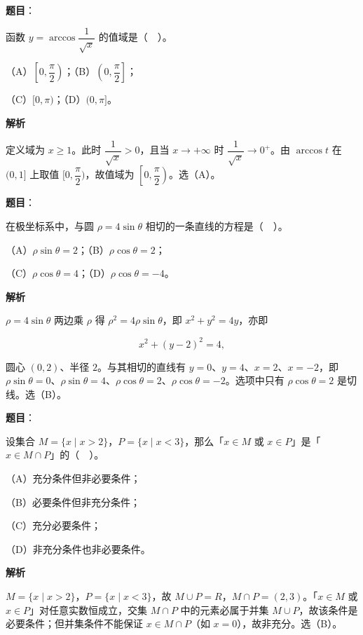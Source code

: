 \begin{answer}

\textbf{题目}：

函数 $y=\arccos\dfrac{1}{\sqrt{x}}$ 的值域是（　）。

（A）$\left[0,\dfrac{\pi}{2}\right)$；（B）$\left(0,\dfrac{\pi}{2}\right]$；

（C）$[0,\pi)$；（D）$(0,\pi]$。

\textbf{解析}

定义域为 $x\ge 1$。此时 $\dfrac{1}{\sqrt{x}}>0$，且当 $x\to+\infty$ 时 $\dfrac{1}{\sqrt{x}}\to 0^{+}$。由 $\arccos t$ 在 $(0,1]$ 上取值 $[0,\dfrac{\pi}{2})$，故值域为 $\left[0,\dfrac{\pi}{2}\right)$。选（A）。


\end{answer}
\begin{answer}

\textbf{题目}：

在极坐标系中，与圆 $\rho=4\sin\theta$ 相切的一条直线的方程是（　）。

（A）$\rho\sin\theta=2$；（B）$\rho\cos\theta=2$；

（C）$\rho\cos\theta=4$；（D）$\rho\cos\theta=-4$。

\textbf{解析}

$\rho=4\sin\theta$ 两边乘 $\rho$ 得 $\rho^{2}=4\rho\sin\theta$，即 $x^{2}+y^{2}=4y$，亦即

\nopagebreak[4]
\[
x^{2}+(y-2)^{2}=4,
\]

圆心 $(0,2)$、半径 $2$。与其相切的直线有 $y=0$、$y=4$、$x=2$、$x=-2$，即 $\rho\sin\theta=0$、$\rho\sin\theta=4$、$\rho\cos\theta=2$、$\rho\cos\theta=-2$。选项中只有 $\rho\cos\theta=2$ 是切线。选（B）。


\end{answer}
\begin{answer}

\textbf{题目}：

设集合 $M=\{x\mid x>2\}$，$P=\{x\mid x<3\}$，那么「$x\in M$ 或 $x\in P$」是「$x\in M\cap P$」的（　）。

（A）充分条件但非必要条件；

（B）必要条件但非充分条件；

（C）充分必要条件；

（D）非充分条件也非必要条件。

\textbf{解析}

$M=\{x\mid x>2\}$，$P=\{x\mid x<3\}$，故 $M\cup P=R$，$M\cap P=(2,3)$。「$x\in M$ 或 $x\in P$」对任意实数恒成立，交集 $M\cap P$ 中的元素必属于并集 $M\cup P$，故该条件是必要条件；但并集条件不能保证 $x\in M\cap P$（如 $x=0$），故非充分。选（B）。


\end{answer}

